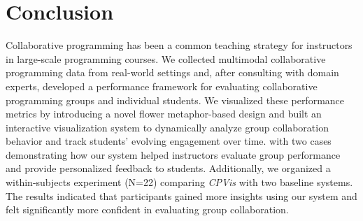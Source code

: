 \section{Conclusion}
Collaborative programming has been a common teaching strategy for instructors in large-scale programming courses.
We collected multimodal collaborative programming data from real-world settings and, after consulting with domain experts, developed a performance framework for evaluating collaborative programming groups and individual students. We visualized these performance metrics by introducing a novel flower metaphor-based design and built an interactive visualization system to dynamically analyze group collaboration behavior and track students' evolving engagement over time.
 with two cases demonstrating how our system helped instructors evaluate group performance and provide personalized feedback to students. Additionally, we organized a within-subjects experiment (N=22) comparing \textit{CPVis} with two baseline systems. The results indicated that participants gained more insights using our system and felt significantly more confident in evaluating group collaboration.